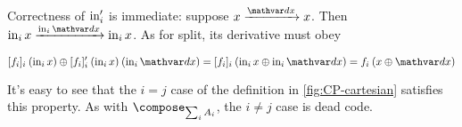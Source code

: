 \noindent
Correctness of $\mathrm{in}'_i$ is immediate: suppose $\vld\dx x x$. Then
\(\vld{\inj i \dx}{\inj i x}{\inj i x}\). As for split, its derivative must obey

\nopagebreak[2]
\begin{equation*}
  \krof{f_i}_i\<(\inj i x) \upd \deriv{\krof{f_i}_i} \<(\inj i x) \<(\inj i \dx)
  = \krof{f_i}_i\<(\inj i x \upd \inj i \dx)
  = f_i \<(x \upd \dx)
\end{equation*}

\noindent It's easy to see that the $i = j$ case of the definition in
\cref{fig:CP-cartesian} satisfies this property. As with $\composefn_{\sum_i
  A_i}$, the $i \ne j$ case is dead code.










